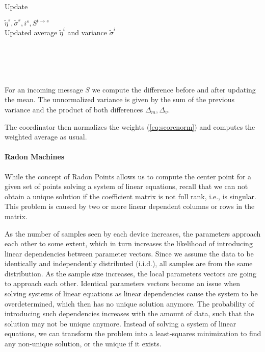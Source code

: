 \begin{algo}{Update}
    \begin{algorithm}[H]
        \begin{algorithmic}[1]
    \REQUIRE $\tilde{\eta}^s, \tilde{\sigma}^s, i^s, S^{t \rightarrow s}$ \\
    \ENSURE  Updated average $\tilde{\eta}^i$ and variance $\tilde{\sigma}^i$ \\
    \\
    \\
    \\
    \\
\end{algorithmic}
\caption[Update procedure for the online mean and variance computation]{For an incoming message $S$ we compute the difference before and after updating the mean. The unnormalized variance is given by the sum of the previous variance and the product of both differences $\Delta_m, \Delta_v$.}
\label{alg:updWelford}
\end{algorithm}
\end{algo}

The coordinator then normalizes the weights (\autoref{eq:scorenorm}) and computes the weighted average as usual.

\paragraph*{Radon Machines}
While the concept of Radon Points allows us to compute the center point for a given set of points solving a system of linear equations, recall that we can not obtain a unique solution if the coefficient matrix is not full rank, i.e., is singular.
This problem is caused by two or more linear dependent columns or rows in the matrix.

As the number of samples seen by each device increases, the parameters approach each other to some extent, which in turn increases the likelihood of introducing linear dependencies between parameter vectors.
Since we assume the data to be identically and independently distributed (i.i.d.), all samples are from the same distribution. 
As the sample size increases, the local parameters vectors are going to approach each other.
Identical parameters vectors become an issue when solving systems of linear equations as linear dependencies cause the system to be overdetermined, which then has no unique solution anymore.
The probability of introducing such dependencies increases with the amount of data, such that the solution may not be unique anymore.
Instead of solving a system of linear equations, we can transform the problem into a least-squares minimization to find any non-unique solution, or the unique if it exists.

